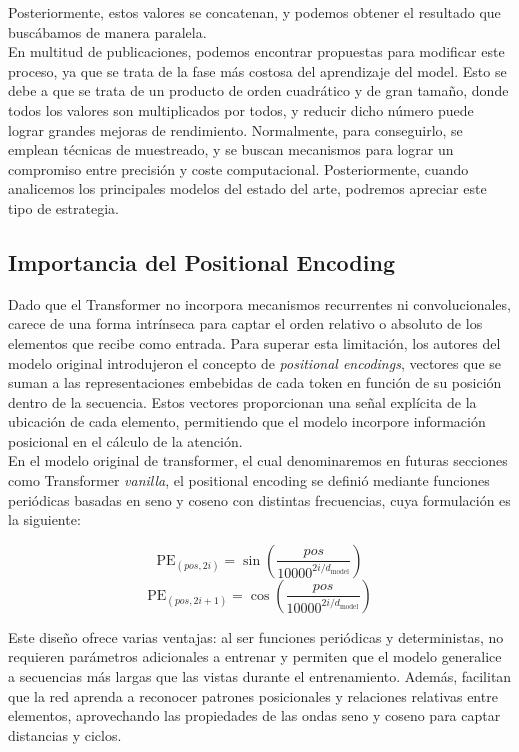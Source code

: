 Posteriormente, estos valores se concatenan, y podemos obtener el resultado que buscábamos de manera paralela.\\

En multitud de publicaciones, podemos encontrar propuestas para modificar este proceso, ya que se trata de la fase más costosa del aprendizaje del model. Esto se debe a que se trata de un producto de orden cuadrático y de gran tamaño, donde todos los valores son multiplicados por todos, y reducir dicho número puede lograr grandes mejoras de rendimiento. Normalmente, para conseguirlo, se emplean técnicas de muestreado, y se buscan mecanismos para lograr un compromiso entre precisión y coste computacional. Posteriormente, cuando analicemos los principales modelos del estado del arte, podremos apreciar este tipo de estrategia.

\subsection{Importancia del Positional Encoding}

Dado que el Transformer no incorpora mecanismos recurrentes ni convolucionales, carece de una forma intrínseca para captar el orden relativo o absoluto de los elementos que recibe como entrada. Para superar esta limitación, los autores del modelo original introdujeron el concepto de \textit{positional encodings}, vectores que se suman a las representaciones embebidas de cada token en función de su posición dentro de la secuencia. Estos vectores proporcionan una señal explícita de la ubicación de cada elemento, permitiendo que el modelo incorpore información posicional en el cálculo de la atención.\\

En el modelo original de transformer, el cual denominaremos en futuras secciones como Transformer \textit{vanilla}, el positional encoding se definió mediante funciones periódicas basadas en seno y coseno con distintas frecuencias, cuya formulación es la siguiente:

\begin{equation}
    \text{PE}_{(pos, 2i)} = \sin\left( \frac{pos}{10000^{2i/d_{\text{model}}}} \right)
\end{equation}
\begin{equation}
    \text{PE}_{(pos, 2i+1)} = \cos\left( \frac{pos}{10000^{2i/d_{\text{model}}}} \right)
\end{equation}

Este diseño ofrece varias ventajas: al ser funciones periódicas y deterministas, no requieren parámetros adicionales a entrenar y permiten que el modelo generalice a secuencias más largas que las vistas durante el entrenamiento. Además, facilitan que la red aprenda a reconocer patrones posicionales y relaciones relativas entre elementos, aprovechando las propiedades de las ondas seno y coseno para captar distancias y ciclos.\\

